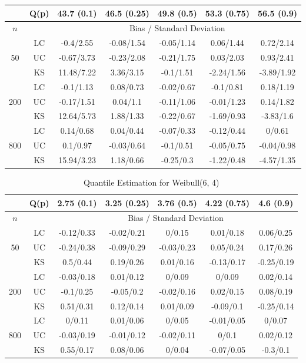 \documentclass[10pt]{article}
\begin{document}
\begin{center}
\begin{table}[H]
\begin{tabular} {| c | c | c | c | c | c | c | }
	 \hline
		&Q(p)&	43.7 (0.1)&	46.5 (0.25)&	49.8 (0.5)&	53.3 (0.75)&	56.5 (0.9)\\ 
 \hline 
 	$n$ & & \multicolumn{5}{|c|}{Bias / Standard Deviation} 
 \\ 
 \hline 
\multirow{3}{*}{50}		&	LC	&-0.4/2.55	&-0.08/1.54	&-0.05/1.14	&0.06/1.44	&0.72/2.14\\ 
			&	UC	&-0.67/3.73	&-0.23/2.08	&-0.21/1.75	&0.03/2.03	&0.93/2.41\\ 
			&	KS	&11.48/7.22	&3.36/3.15	&-0.1/1.51	&-2.24/1.56	&-3.89/1.92\\ 
	\hline 
\multirow{3}{*}{200}		&	LC	&-0.1/1.13	&0.08/0.73	&-0.02/0.67	&-0.1/0.81	&0.18/1.19\\ 
			&	UC	&-0.17/1.51	&0.04/1.1	&-0.11/1.06	&-0.01/1.23	&0.14/1.82\\ 
			&	KS	&12.64/5.73	&1.88/1.33	&-0.22/0.67	&-1.69/0.93	&-3.83/1.6\\ 
	\hline 
\multirow{3}{*}{800}		&	LC	&0.14/0.68	&0.04/0.44	&-0.07/0.33	&-0.12/0.44	&0/0.61\\ 
			&	UC	&0.1/0.97	&-0.03/0.64	&-0.1/0.51	&-0.05/0.75	&-0.04/0.98\\ 
			&	KS	&15.94/3.23	&1.18/0.66	&-0.25/0.3	&-1.22/0.48	&-4.57/1.35\\ 
	\hline 

\end{tabular}

\end{table}

\begin{table}[H]

\caption{Quantile Estimation for Weibull(6, 4)}

\begin{tabular} {| c | c | c | c | c | c | c | } 

	 \hline
		&Q(p)&	2.75 (0.1)&	3.25 (0.25)&	3.76 (0.5)&	4.22 (0.75)&	4.6 (0.9)\\ 
 \hline 
 	$n$ & & \multicolumn{5}{|c|}{Bias / Standard Deviation} 
 \\ 
 \hline 
\multirow{3}{*}{50}		&	LC	&-0.12/0.33	&-0.02/0.21	&0/0.15	&0.01/0.18	&0.06/0.25\\ 
			&	UC	&-0.24/0.38	&-0.09/0.29	&-0.03/0.23	&0.05/0.24	&0.17/0.26\\ 
			&	KS	&0.5/0.44	&0.19/0.26	&0.01/0.16	&-0.13/0.17	&-0.25/0.19\\ 
	\hline 
\multirow{3}{*}{200}		&	LC	&-0.03/0.18	&0.01/0.12	&0/0.09	&0/0.09	&0.02/0.14\\ 
			&	UC	&-0.1/0.25	&-0.05/0.2	&-0.02/0.16	&0.02/0.15	&0.08/0.19\\ 
			&	KS	&0.51/0.31	&0.12/0.14	&0.01/0.09	&-0.09/0.1	&-0.25/0.14\\ 
	\hline 
\multirow{3}{*}{800}		&	LC	&0/0.11	&0.01/0.06	&0/0.05	&-0.01/0.05	&0/0.07\\ 
			&	UC	&-0.03/0.19	&-0.01/0.12	&-0.02/0.11	&0/0.1	&0.02/0.12\\ 
			&	KS	&0.55/0.17	&0.08/0.06	&0/0.04	&-0.07/0.05	&-0.3/0.1\\ 
	\hline 


\end{tabular}
\end{table}
\end{center}
\end{document}
